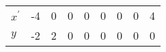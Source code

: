 \documentclass{standalone}
\begin{document}
\begin{tabular}{l|rrrrrrrr}
\toprule
$x^\prime$ & -4 & 0 & 0 & 0 & 0 & 0 & 0 & 4 \\
$y$ & -2 & 2 & 0 & 0 & 0 & 0 & 0 & 0 \\
\bottomrule
\end{tabular}
\end{document}
